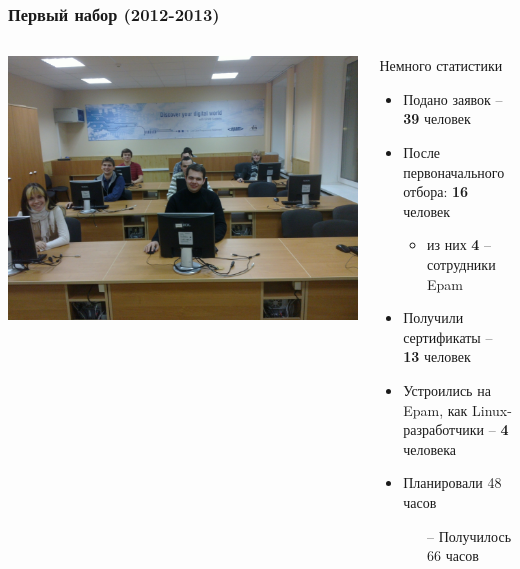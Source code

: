 \begin{frame}
  \frametitle{Первый набор (2012-2013)}
  \begin{columns}
	\includegraphics[width=\textwidth]{epam-evm_lab512}

	\begin{block}{Немного статистики}
		\begin{itemize}
			\item Подано заявок -- {\bf 39} человек
			\item После первоначального отбора: {\bf 16} человек
				\begin{itemize}
					\item из них {\bf 4} -- сотрудники Epam
				\end{itemize}
			\item Получили сертификаты -- {\bf 13} человек
			\item Устроились на Epam, как Linux-разработчики -- {\bf 4} человека
            \item Планировали 48 часов
			\begin{itemize}
    				\item[--] Получилось 66 часов
			\end{itemize}
		\end{itemize}
	\end{block}
  \end{columns}
\end{frame}

